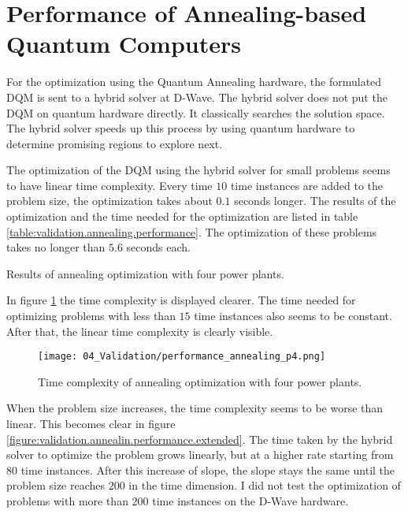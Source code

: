 \section{Performance of Annealing-based Quantum Computers}

For the optimization using the Quantum Annealing hardware, the formulated DQM is sent to a hybrid solver at D-Wave.
The hybrid solver does not put the DQM on quantum hardware directly.
It classically searches the solution space.
The hybrid solver speeds up this process by using quantum hardware to determine promising regions to explore next.
\cite{DQMHybrid2020}

The optimization of the DQM using the hybrid solver for small problems seems to have linear time complexity.
Every time $10$ time instances are added to the problem size, the optimization takes about $0.1$ seconds longer.
The results of the optimization and the time needed for the optimization are listed in table \ref{table:validation.annealing.performance}.
The optimization of these problems takes no longer than $5.6$ seconds each.

\begin{table}[ht]
  \centering
  
  \caption{Results of annealing optimization with four power plants.}
  \label{table:validation.annealing.performance}
\end{table}

In figure \ref{figure:validation.annealing.performance} the time complexity is displayed clearer.
The time needed for optimizing problems with less than $15$ time instances also seems to be constant.
After that, the linear time complexity is clearly visible.

\begin{figure}[ht]
  \centering
  \texttt{[image: 04\_Validation/performance\_annealing\_p4.png]}
  \caption{Time complexity of annealing optimization with four power plants.}
  \label{figure:validation.annealing.performance}
\end{figure}

When the problem size increases, the time complexity seems to be worse than linear.
This becomes clear in figure \ref{figure:validation.annealin.performance.extended}.
The time taken by the hybrid solver to optimize the problem grows linearly, but at a higher rate starting from $80$ time instances.
After this increase of slope, the slope stays the same until the problem size reaches $200$ in the time dimension.
I did not test the optimization of problems with more than $200$ time instances on the D-Wave hardware.

